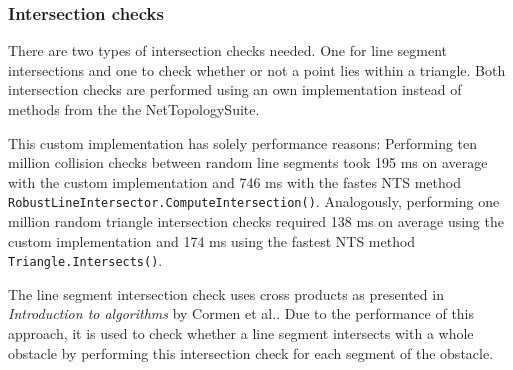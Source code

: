 		\subsubsection{Intersection checks}
		\label{subsubsec:intersection-checks}
			
			There are two types of intersection checks needed.
			One for line segment intersections and one to check whether or not a point lies within a triangle.
			Both intersection checks are performed using an own implementation instead of methods from the the NetTopologySuite.
			
			This custom implementation has solely performance reasons:
			Performing ten million collision checks between random line segments took 195 ms on average with the custom implementation and 746 ms with the fastes NTS method \texttt{RobustLineIntersector.ComputeIntersection()}.
			Analogously, performing one million random triangle intersection checks required 138 ms on average using the custom implementation and 174 ms using the fastest NTS method \texttt{Triangle.Intersects()}.
			
			The line segment intersection check uses cross products as presented in \emph{Introduction to algorithms} by Cormen et al.\cite[1018]{cormen-introduction-to-alg}.
			Due to the performance of this approach, it is used to check whether a line segment intersects with a whole obstacle by performing this intersection check for each segment of the obstacle.
			
